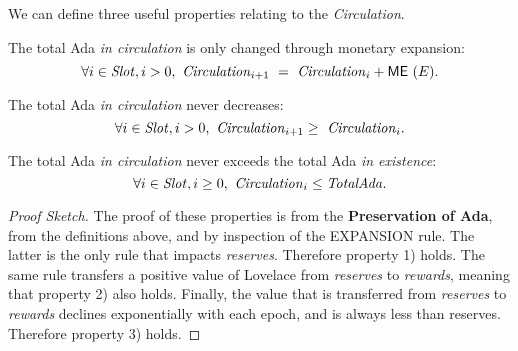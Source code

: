 \noindent
We can define three useful properties relating to the \emph{Circulation}.

\begin{property}
  The total Ada \emph{in circulation} is only changed through monetary expansion:
  $$
  \forall i \in \mathit{Slot}, i > 0, ~\mathit{Circulation}_{i+1} ~= ~\mathit{Circulation}_{i} + \mathsf{ME}~\mathit{(}E).
  $$
\end{property}
\begin{property}
  The total Ada \emph{in circulation} never decreases:
  $$
  \forall i \in \mathit{Slot}, i > 0, ~\mathit{Circulation}_{i+1} \ge ~\mathit{Circulation}_{i}.
  $$
\end{property}
\begin{property}
  The total Ada \emph{in circulation} never exceeds the total Ada \emph{in existence}:
  $$
  \forall i \in \mathit{Slot}, i \ge 0, ~\mathit{Circulation}_i \le \mathit{TotalAda}.
  $$
\end{property}

\begin{proof}[Proof Sketch]

\noindent
The proof of these properties is from the \textbf{Preservation of Ada}, from the definitions above, and by inspection of the EXPANSION rule.
The latter is the only rule that impacts \textit{reserves}.  Therefore property 1) holds.
The same rule transfers a positive value of Lovelace from \textit{reserves} to \textit{rewards}, meaning
that property 2) also holds.
Finally, the value that is transferred from \textit{reserves} to \textit{rewards} declines exponentially with each epoch,
and is always less than reserves.  Therefore property 3) holds.

\end{proof}




